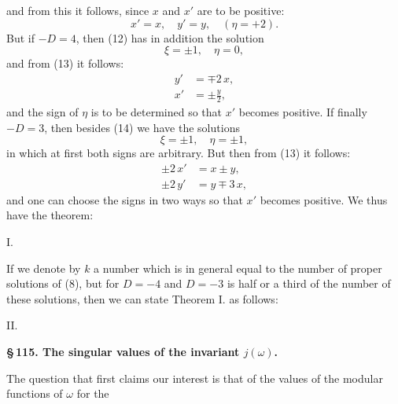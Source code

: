 and from this it follows, since $x$ and $x'$ are to be positive:
\[
x' = x, \quad y' = y, \quad (\eta = + 2).
\]
But if $-D = 4$, then (12) has in addition the solution
\[
\xi = \pm 1, \quad \eta = 0,
\]
and from (13) it follows:
\[
\begin{aligned}
y' &= \mp 2\,x, \\
x' &= \pm \frac{y}{2},
\end{aligned}
\]
and the sign of $\eta$ is to be determined so that $x'$ becomes positive. %
If finally $-D = 3$, then besides (14) we have the solutions
\[
\xi = \pm 1, \quad \eta = \pm 1,
\]
in which at first both signs are arbitrary.
But then from (13) it follows:
\[
\begin{aligned}
\pm 2\,x' &= x \pm y, \\
\pm 2\,y' &= y \mp 3\,x,
\end{aligned}
\]
and one can choose the signs in two ways so that $x'$ becomes positive. We thus have the theorem:

I. 

If we denote by $k$ a number which is in general equal to the number of proper solutions of (8), but for $D = -4$ and $D = -3$ is half or a third of the number of these solutions, then we can state Theorem I. as follows:

II. 

\begin{center}
\textbf{\S\,115. The singular values of the invariant $j(\omega)$.}
\end{center}

The question that first claims our interest is that of the values of the modular functions of $\omega$ for the
